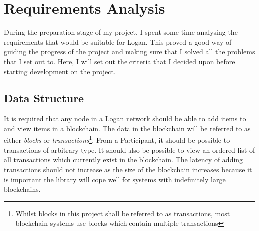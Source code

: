 \documentclass[12pt,a4paper,twoside,openright]{report}
\begin{document}
	\section{Requirements Analysis} \label{Requirements Analysis}
	During the preparation stage of my project, I spent some time analysing the requirements that would be suitable for Logan. 
	This proved a good way of guiding the progress of the project and making sure that I solved all the problems that I set out to. 
	Here, I will set out the criteria that I decided upon before starting development on the project.
	\subsection{Data Structure}
	It is required that any node in a Logan network should be able to add items to and view items in a blockchain. 
	The data in the blockchain will be referred to as either \textit{blocks} or \textit{transactions}\footnote{Whilst blocks in this project shall be referred to as transactions, most blockchain systems use blocks which contain multiple transactions}. 
	From a Participant, it should be possible to transactions of arbitrary type. 
	It should also be possible to view an ordered list of all transactions which currently exist in the blockchain.
	The latency of adding transactions should not increase as the size of the blockchain increases because it is important the library will cope well for systems with indefinitely large blockchains.\\
\end{document}
